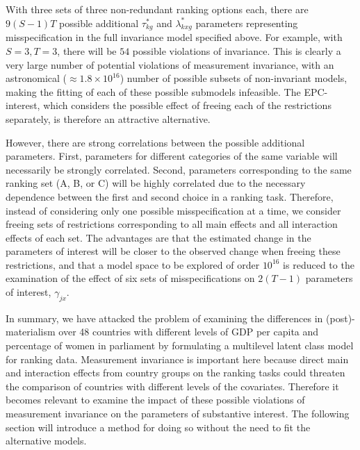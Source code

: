 \documentclass[letterpaper,12pt]{article}
\begin{document}
With three sets of three non-redundant ranking options each, there are $9 (S - 1) T$ possible additional $\tau^{*}_{k g}$ and $\lambda^{*}_{k x g}$ parameters representing misspecification in the full invariance model specified above. For example, with $S=3, T=3$, there will be $54$ possible violations of invariance. %
This is clearly a very large number of potential violations of measurement invariance, with an astronomical ($\approx 1.8 \times 10^{16}$) number of possible subsets of non-invariant models, making the fitting of each of these possible submodels infeasible. The EPC-interest, which considers the possible effect of freeing each of the restrictions separately, is therefore an attractive alternative. 

However, there are strong correlations between the possible additional parameters. First, parameters for different categories of the same variable will necessarily be strongly correlated. Second, parameters corresponding to the same ranking set (A, B, or C) will be highly correlated due to the necessary dependence between the first and second choice in a ranking task. Therefore, instead of considering only one possible misspecification at a time, we consider freeing sets of restrictions corresponding to all main effects and all interaction effects of each set. The advantages are that the estimated change in the parameters of interest will be closer to the observed change when freeing these restrictions, and that a model space to be explored of order $10^{16}$ is reduced to the examination of the effect of six sets of misspecifications on $2 (T-1)$  parameters of interest, $\gamma_{jx}$.

\bigskip
In summary, we have attacked the problem of examining the differences in (post)-materialism over 48 countries with different levels of GDP per capita and percentage of women in parliament by formulating a multilevel latent class model for ranking data. Measurement invariance is important here because direct main and interaction effects from country groups on the ranking tasks could threaten the comparison of countries with different levels of the covariates. Therefore it becomes relevant to examine the impact of these possible violations of measurement invariance on the parameters of substantive interest. The following section will introduce a method for doing so without the need to fit the alternative models. 
\end{document}
